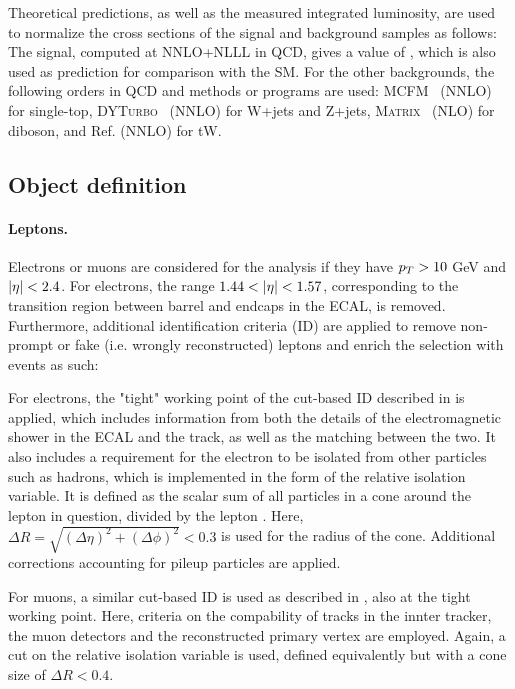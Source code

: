 Theoretical predictions, as well as the measured integrated luminosity, are used to normalize the cross sections of the signal and background samples as follows: The \ttbar signal, computed at NNLO+NLLL in QCD, gives a value of \xsecpred, which is also used as prediction for comparison with the SM. For the other backgrounds, the following orders in QCD and methods or programs are used: \textsc{MCFM}~\cite{Campbell:2020fhf} (NNLO) for single-top, \textsc{DYTurbo}~\cite{Camarda:2019zyx} (NNLO) for W+jets and Z+jets, \textsc{Matrix}~\cite{Grazzini:2017mhc} (NLO) for diboson, and Ref. \cite{Kidonakis:2021vob} (NNLO) for tW.




\subsection{Object definition}
\label{sec:ttxs:objects}

\paragraph{Leptons.}

Electrons or muons are considered for the analysis if they have $p_T > 10$ GeV and $|\eta| < 2.4$. For electrons, the range $1.44 < |\eta| < 1.57$, corresponding to the transition region between barrel and endcaps in the ECAL, is removed. Furthermore, additional identification criteria (ID) are applied to remove non-prompt or fake (i.e. wrongly reconstructed) leptons and enrich the selection with \ttbar events as such:

For electrons, the "tight" working point of the cut-based ID described in  is applied, which includes information from both the details of the electromagnetic shower in the ECAL and the track, as well as the matching between the two. It also includes a requirement for the electron to be isolated from other particles such as hadrons, which is implemented in the form of the relative isolation variable. It is defined as the scalar \pt sum of all particles in a cone around the lepton in question, divided by the lepton \pt. Here, $\Delta R = \sqrt{(\Delta \eta)^2 + (\Delta \phi)^2} < 0.3$ is used for the radius of the cone. Additional corrections accounting for pileup particles are applied.

For muons, a similar cut-based ID is used as described in , also at the tight working point. Here, criteria on the compability of tracks in the innter tracker, the muon detectors and the reconstructed primary vertex are employed. Again, a cut on the relative isolation variable is used, defined equivalently but with a cone size of $\Delta R < 0.4$.

